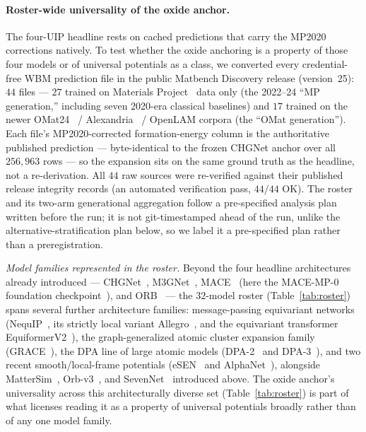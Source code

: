 \documentclass[11pt]{article}
\begin{document}
\paragraph{Roster-wide universality of the oxide anchor.} The four-UIP headline rests on
cached predictions that carry the MP2020 corrections natively. To test whether the oxide
anchoring is a property of those four models or of universal potentials as a class, we converted
every credential-free WBM prediction file in the public Matbench Discovery release
(version~25): $44$ files --- $27$ trained on Materials Project~\citep{jain2013mp} data only (the
2022--24 ``MP generation,'' including seven 2020-era classical baselines) and $17$ trained on the
newer OMat24~\citep{barrosoluque2024omat24} / Alexandria~\citep{schmidt2023alexandria} / OpenLAM
corpora (the ``OMat generation''). Each file's MP2020-corrected
formation-energy column is the authoritative published prediction --- byte-identical to the
frozen CHGNet anchor over all $256{,}963$ rows --- so the expansion sits on the same ground truth
as the headline, not a re-derivation. All $44$ raw sources were re-verified against their
published release integrity records (an automated verification pass, $44/44$ OK). The roster and
its two-arm generational aggregation follow a pre-specified analysis plan written before the
run; it is not
git-timestamped ahead of the run, unlike the alternative-stratification plan below, so we label it
a pre-specified plan rather than a preregistration.

\emph{Model families represented in the roster.} Beyond the four headline architectures already
introduced --- CHGNet~\citep{deng2023}, M3GNet~\citep{chen2022}, MACE~\citep{batatia2022mace}
(here the MACE-MP-0 foundation checkpoint~\citep{batatia2024macemp0}), and ORB~\citep{neumann2024}
--- the $32$-model roster (Table~\ref{tab:roster}) spans several further architecture families:
message-passing equivariant networks (NequIP~\citep{nequip2022}, its strictly local variant
Allegro~\citep{allegro2023}, and the equivariant transformer EquiformerV2~\citep{liao2024equiformerv2}),
the graph-generalized atomic cluster expansion family (GRACE~\citep{grace2024}), the DPA line of
large atomic models (DPA-2~\citep{zhang2024dpa2} and DPA-3~\citep{zhang2025dpa3}), and two recent
smooth/local-frame potentials (eSEN~\citep{fu2025esen} and AlphaNet~\citep{yin2025alphanet}),
alongside MatterSim~\citep{yang2024mattersim}, Orb-v3~\citep{rhodes2025orbv3}, and
SevenNet~\citep{park2024sevennet,sevennet} introduced above. The oxide anchor's universality
across this architecturally diverse set (Table~\ref{tab:roster}) is part of what licenses reading
it as a property of universal potentials broadly rather than of any one model family.
\end{document}
